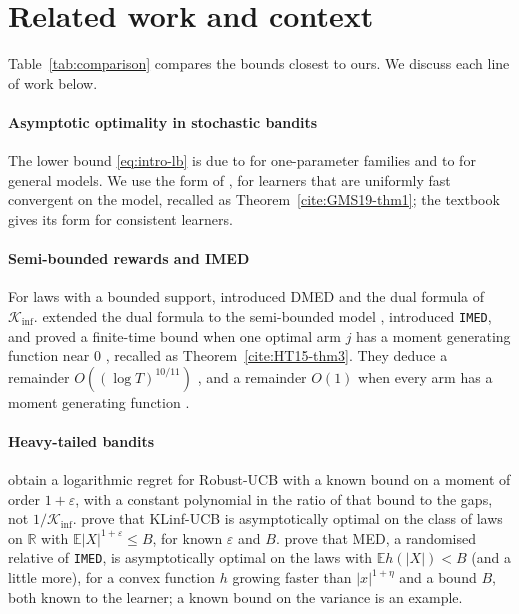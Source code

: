 \documentclass[11pt]{article}
\newcommand{\E}{\mathbb{E}}
\newcommand{\R}{\mathbb{R}}
\begin{document}
\section{Related work and context}\label{sec:related}

Table~\ref{tab:comparison} compares the bounds closest to ours. We discuss each line of work below.

\paragraph{Asymptotic optimality in stochastic bandits} The lower bound \eqref{eq:intro-lb} is due to
\citet{LR85} for one-parameter families and to \citet{BK96} for general models. We use the form of
\citet[Theorem~1]{GMS19}, for learners that are uniformly fast convergent on the model, recalled as
Theorem~\ref{cite:GMS19-thm1}; the textbook \citet[Chapter~16]{LS} gives its form for consistent
learners.

\paragraph{Semi-bounded rewards and IMED} For laws with a bounded support, \citet{HT10} introduced
DMED and the dual formula of $\mathcal K_{\inf}$. \citet{HT15} extended the dual formula to the
semi-bounded model \citep[Theorem~2]{HT15}, introduced \texttt{IMED}, and proved a finite-time bound
when one optimal arm $j$ has a moment generating function near $0$ \citep[Theorem~3]{HT15},
recalled as Theorem~\ref{cite:HT15-thm3}. They deduce a remainder $O((\log T)^{10/11})$
\citep[Corollary~4]{HT15}, and a remainder $O(1)$ when every arm has a moment generating function
\citep[Theorem~5]{HT15}.

\paragraph{Heavy-tailed bandits} \citet[Theorem~1]{BCL13} obtain a logarithmic regret for
Robust-UCB with a known bound on a moment of order $1+\varepsilon$, with a constant polynomial in the
ratio of that bound to the gaps, not $1/\mathcal K_{\inf}$. \citet[Corollary~2]{AJK21} prove that
KLinf-UCB is asymptotically optimal on the class of laws on $\R$ with $\E|X|^{1+\varepsilon}\le B$,
for known $\varepsilon$ and $B$. \citet[Section~4.4]{BSH23} prove that MED, a randomised relative of
\texttt{IMED}, is asymptotically optimal on the laws with $\E h(|X|)<B$ (and a little more), for a
convex function $h$ growing faster than $|x|^{1+\eta}$ and a bound $B$, both known to the learner;
a known bound on the variance is an example.
\end{document}
